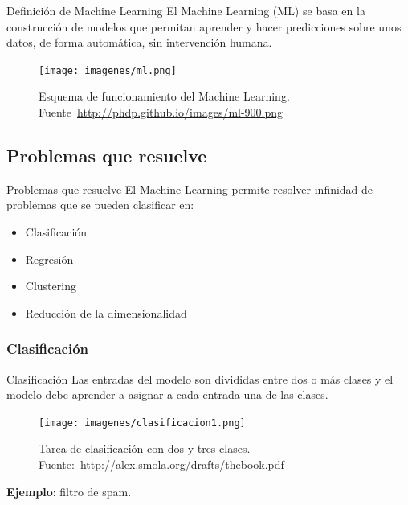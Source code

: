 \documentclass[hyperref={unicode}]{beamer}
\begin{document}
\begin{frame}{Definición de Machine Learning}
	El Machine Learning (ML) se basa en la construcción de modelos que permitan aprender y hacer predicciones sobre unos datos, de forma automática, sin intervención humana.\\
	
	\begin{figure}
		\begin{center}
		\texttt{[image: imagenes/ml.png]}
		\caption{Esquema de funcionamiento del Machine Learning. Fuente~\url{http://phdp.github.io/images/ml-900.png}}
		\end{center}
	\end{figure}

\end{frame}

\subsection{Problemas que resuelve}
\begin{frame}{Problemas que resuelve}
El Machine Learning permite resolver infinidad de problemas que se pueden clasificar en:\\

\begin{itemize}
\item Clasificación
\item Regresión
\item Clustering
\item Reducción de la dimensionalidad
\end{itemize}
\end{frame}

\subsubsection{Clasificación}
\begin{frame}{Clasificación}
	Las entradas del modelo son divididas entre dos o más clases y el modelo debe aprender a asignar a cada entrada una de las clases. 
	\begin{figure}
		\begin{center}
		\texttt{[image: imagenes/clasificacion1.png]}
		\caption{Tarea de clasificación con dos y tres clases. Fuente:~\url{http://alex.smola.org/drafts/thebook.pdf}}
		\end{center}
	\end{figure}
	
	\textbf{Ejemplo}: filtro de spam.  
\end{frame}
\end{document}
